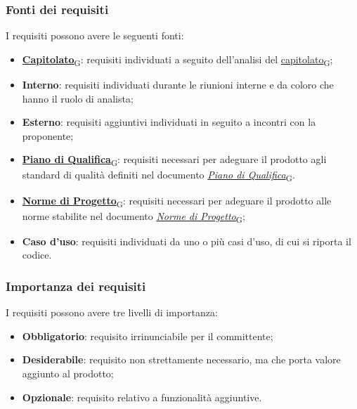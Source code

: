 \subsubsection{Fonti dei requisiti}
\label{sec:fonti_requisiti}
I requisiti possono avere le seguenti fonti:
\begin{itemize}
	\item \href{https://7last.github.io/docs/rtb/documentazione-interna/glossario\#capitolato}{\textbf{Capitolato}\textsubscript{G}}: requisiti individuati a seguito dell'analisi del \href{https://7last.github.io/docs/rtb/documentazione-interna/glossario\#capitolato}{capitolato\textsubscript{G}};
	\item \textbf{Interno}: requisiti individuati durante le riunioni interne e da coloro che hanno il ruolo di analista;
	\item \textbf{Esterno}: requisiti aggiuntivi individuati in seguito a incontri con la proponente;
	\item \href{https://7last.github.io/docs/rtb/documentazione-interna/glossario\#piano-di-qualifica}{\textbf{Piano di Qualifica}\textsubscript{G}}: requisiti necessari per adeguare il prodotto agli standard di qualità definiti nel documento \href{https://7last.github.io/docs/rtb/documentazione-interna/glossario\#piano-di-qualifica}{\textit{Piano di Qualifica}\textsubscript{G}}.
	\item \href{https://7last.github.io/docs/rtb/documentazione-interna/glossario\#norme-di-progetto}{\textbf{Norme di Progetto}\textsubscript{G}}: requisiti necessari per adeguare il prodotto alle norme stabilite nel documento \href{https://7last.github.io/docs/rtb/documentazione-interna/glossario\#norme-di-progetto}{\textit{Norme di Progetto}\textsubscript{G}};
	\item \textbf{Caso d'uso}: requisiti individuati da uno o più casi d'uso, di cui si riporta il codice.
\end{itemize}

\subsubsection{Importanza dei requisiti}
\label{sec:importanza_requisiti}
I requisiti possono avere tre livelli di importanza:
\begin{itemize}
	\item \textbf{Obbligatorio}: requisito irrinunciabile per il committente;
	\item \textbf{Desiderabile}: requisito non strettamente necessario, ma che porta valore aggiunto al prodotto;
	\item \textbf{Opzionale}: requisito relativo a funzionalità aggiuntive.
\end{itemize}


